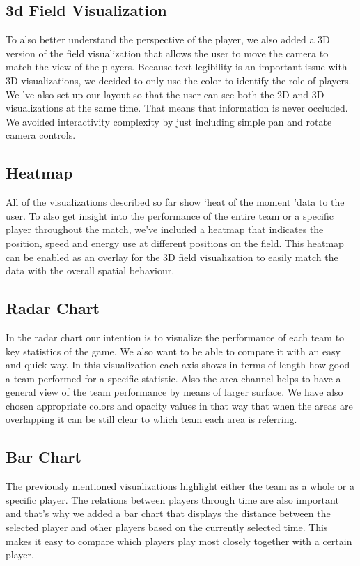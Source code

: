 \documentclass{article}
\begin{document}
\subsection{3d Field Visualization}
To also better understand the perspective of the player, we also added a 3D version of the field visualization that allows the user to move the camera to match the view of the players. Because text legibility is an important issue with 3D visualizations, we decided to only use the color to identify the role of players. We \textquoteright ve also set up our layout so that the user can see both the 2D and 3D visualizations at the same time. That means that information is never occluded. We avoided interactivity complexity by just including simple pan and rotate camera controls.

\subsection{Heatmap}
All of the visualizations described so far show \textquoteleft heat of the moment \textquoteright data to the user. To also get insight into the performance of the entire team or a specific player throughout the match, we\textquoteright ve included a heatmap that indicates the position, speed and energy use at different positions on the field. This heatmap can be enabled as an overlay for the 3D field visualization to easily match the data with the overall spatial behaviour.

\subsection{Radar Chart}
In the radar chart our intention is to visualize the performance of each team to key statistics of the game. We also want to be able to compare it with an easy and quick way. In this visualization each axis shows in terms of length how good a team performed for a specific statistic. Also the area channel helps to have a general view of the team performance by means of larger surface. We have also chosen appropriate colors and opacity values in that way that when the areas are overlapping it can be still clear to which team each area is referring.

\subsection{Bar Chart}
The previously mentioned visualizations highlight either the team as a whole or a specific player. The relations between players through time are also important and that\textquoteright  s why we added a bar chart that displays the distance between the selected player and other players based on the currently selected time. This makes it easy to compare which players play most closely together with a certain player.
\end{document}
